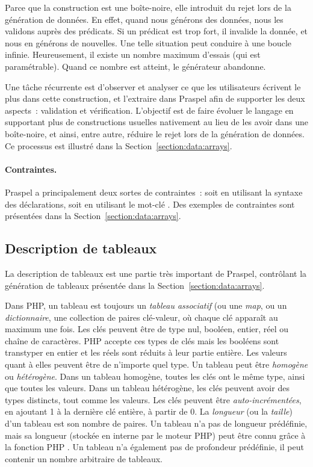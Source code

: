 Parce que la construction \apred{\empty} est une boîte-noire, elle introduit du
rejet lors de la génération de données. En effet, quand nous générons des
données, nous les validons auprès des prédicats. Si un prédicat est trop fort,
il invalide la donnée, et nous en générons de nouvelles. Une telle situation
peut conduire à une boucle infinie. Heureusement, il existe un nombre maximum
d'essais (qui est paramétrable). Quand ce nombre est atteint, le générateur
abandonne.

Une tâche récurrente est d'observer et analyser ce que les utilisateurs écrivent
le plus dans cette construction, et l'extraire dans Praspel afin de supporter
les deux aspects~: validation et vérification. L'objectif est de faire évoluer
le langage en supportant plus de constructions usuelles nativement au lieu de
les avoir dans une boîte-noire, et ainsi, entre autre, réduire le rejet lors de
la génération de données. Ce processus est illustré dans la
Section~\ref{section:data:arrays}.

\paragraph{Contraintes.} Praspel a principalement deux sortes de contraintes~:
soit en utilisant la syntaxe des déclarations, soit en utilisant le mot-clé
. Des exemples de contraintes sont présentées dans la
Section~\ref{section:data:arrays}.

\subsection{Description de tableaux}
\label{subsection:language:array}

La description de tableaux est une partie très important de Praspel, contrôlant
la génération de tableaux présentée dans la Section~\ref{section:data:arrays}.

Dans PHP, un tableau est toujours un {\em tableau associatif} (ou une {\em map},
ou un {\em dictionnaire}, \ie une collection de paires clé-valeur, où chaque clé
apparaît au maximum une fois. Les clés peuvent être de type nul, booléen,
entier, réel ou chaîne de caractères. PHP accepte ces types de clés mais les
booléens sont transtyper en entier et les réels sont réduits à leur partie
entière. Les valeurs quant à elles peuvent être de n'importe quel type. Un
tableau peut être {\em homogène} ou {\em hétérogène}. Dans un tableau homogène,
toutes les clés ont le même type, ainsi que toutes les valeurs. Dans un tableau
hétérogène, les clés peuvent avoir des types distincts, tout comme les valeurs.
Les clés peuvent être {\em auto-incrémentées}, en ajoutant 1 à la dernière clé
entière, à partir de 0. La {\em longueur} (ou la {\em taille}) d'un tableau est
son nombre de paires. Un tableau n'a pas de longueur prédéfinie, mais sa
longueur (stockée en interne par le moteur PHP) peut être connu grâce à la
fonction PHP . Un tableau n'a également pas de profondeur
prédéfinie, \ie il peut contenir un nombre arbitraire de tableaux.


